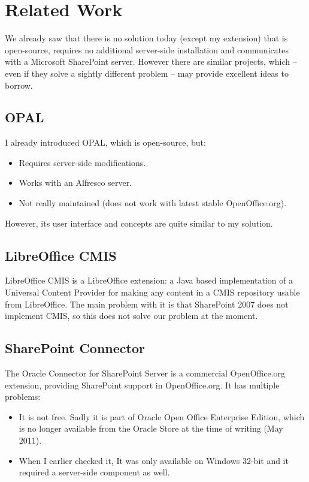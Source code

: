 \section{Related Work}

We already saw that there is no solution today (except my extension) that is
open-source, requires no additional server-side installation and communicates
with a Microsoft SharePoint server. However there are similar projects, which
-- even if they solve a sightly different problem -- may provide excellent
ideas to borrow.

\subsection*{OPAL}
I already introduced OPAL, which is open-source, but:

\begin{itemize}
\item Requires server-side modifications.
\item Works with an Alfresco server.
\item Not really maintained (does not work with latest stable OpenOffice.org).
\end{itemize}

However, its user interface and concepts are quite similar to my solution.

\subsection*{LibreOffice CMIS}
LibreOffice CMIS\cite{locmis} is a LibreOffice extension: a Java based
implementation of a Universal Content Provider for making any content in a CMIS
repository usable from LibreOffice. The main problem with it is that SharePoint
2007 does not implement CMIS, so this does not solve our problem at the moment.

\subsection*{SharePoint Connector}
The Oracle Connector for SharePoint Server\cite{oracle-sp-connector} is a
commercial OpenOffice.org extension, providing SharePoint support in
OpenOffice.org. It has multiple problems:

\begin{itemize}
\item It is not free. Sadly it is part of Oracle Open Office Enterprise
Edition, which is no longer available from the Oracle Store at the time of
writing (May 2011).
\item When I earlier checked it, It was only available on Windows 32-bit and it
required a server-side component as well.
\end{itemize}

